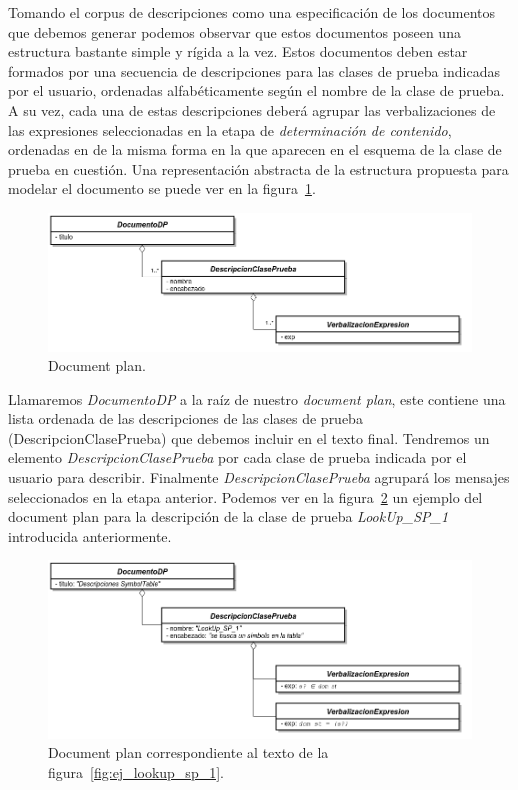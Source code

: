 Tomando el corpus de descripciones como una especificación de los documentos que debemos generar podemos observar que estos documentos poseen una estructura bastante simple y rígida a la vez. Estos documentos deben estar formados por una secuencia de descripciones para las clases de prueba indicadas por el usuario, ordenadas alfabéticamente según el nombre de la clase de prueba. A su vez, cada una de estas descripciones deberá agrupar las verbalizaciones de las expresiones seleccionadas en la etapa de \emph{determinación de contenido}, ordenadas en de la misma forma en la que aparecen en el esquema de la clase de prueba en cuestión. Una representación abstracta de la estructura propuesta para modelar el documento se puede ver en la figura~\ref{fig:png_document_plan}.

\begin{figure}[H]
  	\centering
	\includegraphics[scale=0.4]{img/document_plan.png}
	\caption{Document plan.}
  	\label{fig:png_document_plan}
\end{figure}

Llamaremos \emph{DocumentoDP} a la raíz de nuestro \emph{document plan}, este contiene una lista ordenada de las descripciones de las clases de prueba (DescripcionClasePrueba) que debemos incluir en el texto final. Tendremos un elemento \emph{DescripcionClasePrueba} por cada clase de prueba indicada por el usuario para describir. Finalmente \emph{DescripcionClasePrueba} agrupará los mensajes seleccionados en la etapa anterior. Podemos ver en la figura~\ref{fig:png_document_plan_ej} un ejemplo del document plan para la descripción de la clase de prueba \emph{LookUp\_SP\_1} introducida anteriormente. 

\begin{figure}[H]
  	\centering
	\includegraphics[scale=0.4]{img/document_plan_ej.png}
	\caption{Document plan correspondiente al texto de la figura~\ref{fig:ej_lookup_sp_1}.}
  	\label{fig:png_document_plan_ej}
\end{figure}



